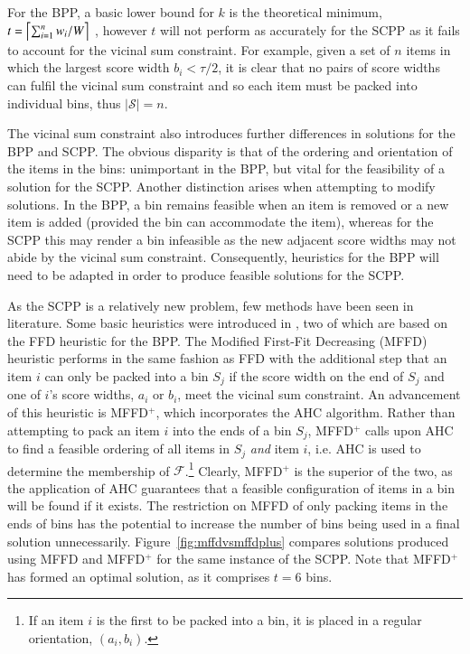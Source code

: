 \documentclass[authoryear]{elsarticle}
\begin{document}
For the BPP, a basic lower bound for $k$ is the theoretical minimum, $t = \ceil*{\sum_{i=1}^{n} w_i / W}$ \citep{martello1990l}, however $t$ will not perform as accurately for the SCPP as it fails to account for the vicinal sum constraint. For example, given a set of $n$ items in which the largest score width $b_i < \tau / 2$, it is clear that no pairs of score widths can fulfil the vicinal sum constraint and so each item must be packed into individual bins, thus $|\mathcal{S}| = n$.

The vicinal sum constraint also introduces further differences in solutions for the BPP and SCPP. The obvious disparity is that of the ordering and orientation of the items in the bins: unimportant in the BPP, but vital for the feasibility of a solution for the SCPP. Another distinction arises when attempting to modify solutions. In the BPP, a bin remains feasible when an item is removed or a new item is added (provided the bin can accommodate the item), whereas for the SCPP this may render a bin infeasible as the new adjacent score widths may not abide by the vicinal sum constraint. Consequently, heuristics for the BPP will need to be adapted in order to produce feasible solutions for the SCPP.

As the SCPP is a relatively new problem, few methods have been seen in literature. Some basic heuristics were introduced in \citet{hawa2018}, two of which are based on the FFD heuristic for the BPP. The Modified First-Fit Decreasing (MFFD) heuristic performs in the same fashion as FFD with the additional step that an item $i$ can only be packed into a bin $S_j$ if the score width on the end of $S_j$ and one of $i$'s score widths, $a_i$ or $b_i$, meet the vicinal sum constraint. An advancement of this heuristic is MFFD$^+$, which incorporates the AHC algorithm. Rather than attempting to pack an item $i$ into the ends of a bin $S_j$, MFFD$^+$ calls upon AHC to find a feasible ordering of all items in $S_j$ \emph{and} item $i$, i.e. AHC is used to determine the membership of $\mathcal{F}$.\footnote{If an item $i$ is the first to be packed into a bin, it is placed in a regular orientation, $(a_i, b_i)$.} Clearly, MFFD$^+$ is the superior of the two, as the application of AHC guarantees that a feasible configuration of items in a bin will be found if it exists. The restriction on MFFD of only packing items in the ends of bins has the potential to increase the number of bins being used in a final solution unnecessarily. Figure~\ref{fig:mffdvsmffdplus} compares solutions produced using MFFD and MFFD$^+$ for the same instance of the SCPP. Note that MFFD$^+$ has formed an optimal solution, as it comprises $t = 6$ bins.
\end{document}
